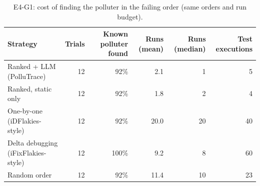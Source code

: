 \begin{table}[t]
\centering
\footnotesize
\caption{E4-G1: cost of finding the polluter in the failing order (same orders and run budget).}
\label{tab:g1}
\begin{tabular}{lrrrrr}
\toprule
\textbf{Strategy} & \textbf{Trials} & \textbf{Known polluter found} & \textbf{Runs (mean)} & \textbf{Runs (median)} & \textbf{Test executions} \\
\midrule
Ranked + LLM (PolluTrace) & 12 & 92\% & 2.1 & 1 & 5 \\
Ranked, static only & 12 & 92\% & 1.8 & 2 & 4 \\
One-by-one (iDFlakies-style) & 12 & 92\% & 20.0 & 20 & 40 \\
Delta debugging (iFixFlakies-style) & 12 & 100\% & 9.2 & 8 & 60 \\
Random order & 12 & 92\% & 11.4 & 10 & 23 \\
\bottomrule
\end{tabular}
\end{table}
